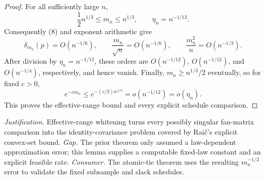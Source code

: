 \documentclass{article}
\begin{document}
\begin{proof}
For all sufficiently large \(n\),
\[
\frac12n^{1/3}\leq m_n\leq n^{1/3},
\qquad
\eta_n=n^{-1/12}.
\]
Consequently (8) and exponent arithmetic give
\[
\delta_{m_n}(p)=O(n^{-1/6}),
\qquad
\frac{m_n}{\sqrt n}=O(n^{-1/6}),
\qquad
\frac{m_n^2}{n}=O(n^{-1/3}).
\tag{9}
\]
After division by \(\eta_n=n^{-1/12}\), these orders are \(O(n^{-1/12})\), \(O(n^{-1/12})\), and \(O(n^{-1/4})\), respectively, and hence vanish.  Finally, \(m_n\geq n^{1/3}/2\) eventually, so for fixed \(c>0\),
\[
e^{-cm_n}\leq e^{-(c/2)n^{1/3}}=o(n^{-1/12})=o(\eta_n).
\]
This proves the effective-range bound and every explicit schedule comparison.
\end{proof}
\par\smallskip\noindent \textit{Justification.} Effective-range whitening turns every possibly singular fan-matrix comparison into the identity-covariance problem covered by Raič's explicit convex-set bound. \textit{Gap.} The prior theorem only assumed a law-dependent approximation error; this lemma supplies a computable fixed-law constant and an explicit feasible rate. \textit{Consumer.} The atomic-tie theorem uses the resulting \(m_n^{-1/2}\) error to validate the fixed subsample and slack schedules.
\end{document}
